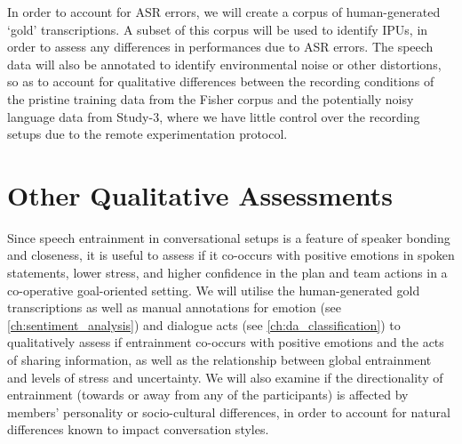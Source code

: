 In order to account for ASR errors, we will create a corpus of human-generated
`gold' transcriptions. A subset of this corpus will be used to
identify IPUs, in order to assess any differences in performances due to ASR
errors. The speech data will also be annotated to identify
environmental noise or other distortions, so as to account for qualitative differences
between the recording conditions of the pristine training data from the Fisher
corpus and the potentially noisy language data from Study-3, where we have
little control over the recording setups due to the remote experimentation
protocol.

\section{Other Qualitative Assessments}

Since speech entrainment in conversational setups is a feature of speaker
bonding and closeness, it is useful to assess if it co-occurs with positive
emotions in spoken statements, lower stress, and higher confidence in the plan
and team actions in a co-operative goal-oriented setting. We will utilise the
human-generated gold transcriptions as well as manual annotations for emotion
(see \autoref{ch:sentiment_analysis}) and dialogue acts (see
\autoref{ch:da_classification}) to qualitatively assess if entrainment
co-occurs with positive emotions and the acts of sharing information, as well
as the relationship between global entrainment and levels of stress and
uncertainty.  We will also examine if the directionality of entrainment
(towards or away from any of the participants) is affected by members'
personality or socio-cultural differences, in order to account for natural
differences known to impact conversation styles.

